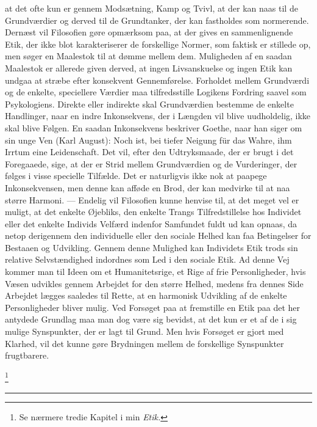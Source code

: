 \documentclass[12pt]{article}
\newcommand{\apage}[1]{\marginnote{\footnotesize\textit{[#1]}}}
\begin{document}
       at det ofte kun er gennem Modsætning, Kamp og Tvivl, at der kan naas til
de Grundværdier og derved til de Grundtanker, der kan fastholdes som
normerende. Dernæst vil Filosofien gøre opmærksom paa, at der gives en
sammenlignende Etik, der ikke blot karakteriserer de forskellige Normer, som
faktisk er stillede op, men søger en Maalestok til at dømme mellem dem.
Muligheden af en saadan Maalestok er allerede given derved, at ingen
Livsanskuelse og ingen Etik kan undgaa at stræbe efter konsekvent
Gennemførelse. Forholdet mellem Grundværdi og de enkelte, speciellere Værdier
maa tilfredsstille Logikens Fordring saavel som Psykologiens. Direkte eller
indirekte skal Grundværdien bestemme de enkelte Handlinger, naar en indre
Inkonsekvens, der i Længden vil blive uudholdelig, ikke skal blive Følgen. En
saadan Inkonsekvens beskriver Goethe, naar han siger om sin unge Ven (Karl
August): Noch ist, bei tiefer Neigung für das Wahre, ihm Irrtum eine
Leidenschaft. Det vil, efter den Udtryksmaade, der er brugt i det Foregaaede,
sige, at der er Strid mellem Grundværdien og de Vurderinger, der følges i visse
specielle Tilfælde. Det er naturligvis ikke nok at
\setcounter{footnote}{0}%
\apage{80}paapege Inkonsekvensen, men denne kan afføde en Brod, der kan
medvirke til at naa større Harmoni. --- Endelig vil Filosofien kunne henvise
til, at det meget vel er muligt, at det enkelte Øjebliks, den enkelte Trangs
Tilfredstillelse hos Individet eller det enkelte Individs Velfærd indenfor
Samfundet fuldt ud kan opnaas, da netop derigennem den individuelle eller den
sociale Helhed kan faa Betingelser for Bestaaen og Udvikling. Gennem denne
Mulighed kan Individets Etik trods sin relative Selvstændighed indordnes som
Led i den sociale Etik. Ad denne Vej kommer man til Ideen om et Humanitetsrige,
et Rige af frie Personligheder, hvis Væsen udvikles gennem Arbejdet for den
større Helhed, medens fra dennes Side Arbejdet lægges saaledes til Rette, at en
harmonisk Udvikling af de enkelte Personligheder bliver mulig. Ved Forsøget paa
at fremstille en Etik paa det her antydede Grundlag maa man dog være sig
bevidst, at det kun er et af de i sig mulige Synspunkter, der er lagt til
Grund. Men hvis Forsøget er gjort med Klarhed, vil det kunne gøre Brydningen
mellem de forskellige Synspunkter frugtbarere.

         \footnote{Se nærmere tredie Kapitel i min \textit{Etik.}}

\begin{center}\rule{3em}{0.4pt}\end{center}
\end{document}

